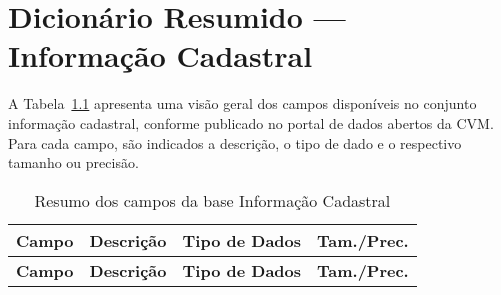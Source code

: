 \documentclass[recuosum=1.5cm]{iftex2024}
\begin{document}
\appendix
\renewcommand{\chaptername}{Apêndice}

\chapter{Dicionário Resumido — Informação Cadastral}
\label{ap:estrutura-informacao-cadastral}

A Tabela~\ref{tab:dic-infocad} apresenta uma visão geral dos campos disponíveis no conjunto informação cadastral, conforme publicado no portal de dados abertos da CVM. Para cada campo, são indicados a descrição, o tipo de dado e o respectivo tamanho ou precisão.

\begin{longtable}{p{5cm} p{5cm} p{2cm} p{2cm}}
	\caption{Resumo dos campos da base Informação Cadastral}
	\label{tab:dic-infocad} \\
	\toprule
	\textbf{Campo} & \textbf{Descrição} & \textbf{Tipo de Dados} & \textbf{Tam./Prec.} \\
	\midrule
	\endfirsthead
	\toprule
	\textbf{Campo} & \textbf{Descrição} & \textbf{Tipo de Dados} & \textbf{Tam./Prec.} \\
	\midrule
	\endhead
	

\end{longtable}
\end{document}
